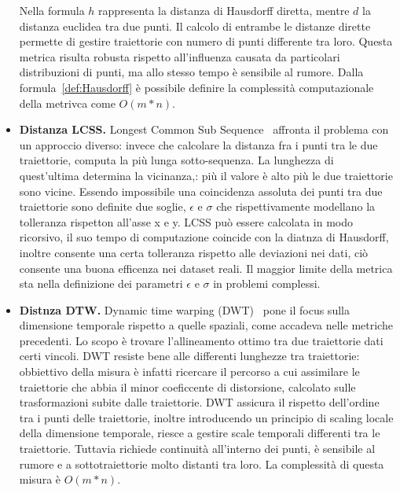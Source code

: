 \begin{itemize}
  Nella formula \(h\) rappresenta la distanza di Hausdorff diretta, mentre \(d\) la distanza euclidea tra due punti.
  Il calcolo di entrambe le distanze dirette permette di gestire traiettorie con numero di punti differente tra loro.
  Questa metrica risulta robusta rispetto all'influenza causata da particolari distribuzioni di punti, ma allo stesso tempo è sensibile
  al rumore. Dalla formula~\cref{def:Hausdorff} è possibile definire la complessità computazionale della metrivca come \(O(m*n)\).


  \item \textbf{Distanza LCSS.}
  Longest Common Sub Sequence~\cite{rick2000efficient} affronta il problema con un approccio diverso: invece che calcolare la distanza fra i punti tra le due traiettorie, computa la
  più lunga sotto-sequenza.
  La lunghezza di quest'ultima determina la vicinanza,: più il valore è alto più le due traiettorie sono vicine.
  Essendo impossibile una coincidenza assoluta dei punti tra due traiettorie sono definite due soglie, \(\epsilon \) e \( \sigma \) che rispettivamente
  modellano la tolleranza rispetton all'asse x e y.
  LCSS può essere calcolata in modo ricorsivo, il suo tempo di computazione coincide con la diatnza di Hausdorff, inoltre consente una certa tolleranza rispetto
  alle deviazioni nei dati, ciò consente una buona efficenza nei dataset reali. Il maggior limite della metrica sta nella definizione dei parametri
  \(\epsilon \) e \( \sigma \) in problemi complessi.

  \item \textbf{Distnza DTW.}
  Dynamic time warping (DWT)~\cite{chen2005robust} pone il focus sulla dimensione temporale rispetto a quelle spaziali, come accadeva nelle metriche precedenti.
  Lo scopo è trovare l'allineamento ottimo tra due traiettorie dati certi vincoli.
  DWT resiste bene alle differenti lunghezze tra traiettorie: obbiettivo della misura è infatti ricercare il percorso a cui assimilare le traiettorie che abbia il minor coeficcente di distorsione,
  calcolato sulle trasformazioni subite dalle traiettorie.
  DWT assicura il rispetto dell'ordine tra i punti delle traiettorie, inoltre introducendo un principio di scaling locale della dimensione temporale,
  riesce a gestire scale temporali differenti tra le traiettorie.
  Tuttavia richiede continuità all'interno dei punti, è sensibile al rumore e a sottotraiettorie molto distanti tra loro.
  La complessità di questa misura è \(O(m*n)\).



\end{itemize}
